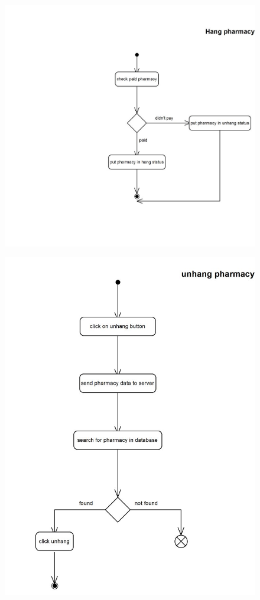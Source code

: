 \documentclass[]{article}
\begin{document}
\begin{figure}[H]
\centering
\includegraphics[scale=0.6]{./activity/24}
\end{figure}
\begin{figure}[H]
\centering
\includegraphics[scale=0.6]{./activity/25}
\end{figure}
\end{document}
